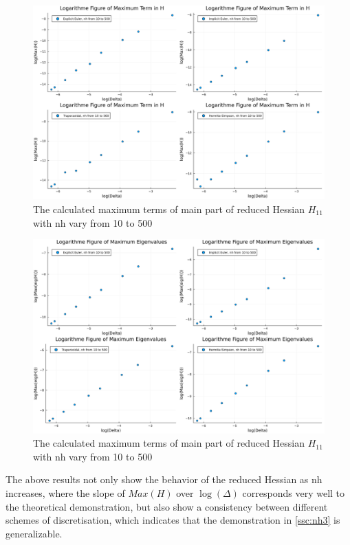 \documentclass{article}
\begin{document}
\begin{figure}[ht]
    \centering
    \includegraphics[width = \textwidth]{Log_maxH.png}
    \caption{\label{fig:maxH} The calculated maximum terms of main part of reduced Hessian $H_{11}$ with nh vary from 10 to 500}
\end{figure}

\begin{figure}[ht]
    \centering
    \includegraphics[width = \textwidth]{Log_maxEig.png}
    \caption{\label{fig:maxeig} The calculated maximum terms of main part of reduced Hessian $H_{11}$ with nh vary from 10 to 500}
\end{figure}

The above results not only show the behavior of the reduced Hessian as nh increases, where the slope of $Max(H)$ over $\log(\Delta)$ corresponds very well to the theoretical demonstration, but also show a consistency between different schemes of discretisation, which indicates that the demonstration in \ref{ssc:nh3} is generalizable.
\end{document}
